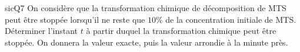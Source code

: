 \begin{questionmult}{sicQ7}
    On considère que la transformation chimique de décomposition de MTS peut être stoppée lorsqu'il ne reste que $10\%$ de la concentration initiale de MTS. Déterminer l'instant $t$ à partir duquel la transformation chimique peut être stoppée. On donnera la valeur exacte, puis la valeur arrondie à la minute près.\\
    \begin{EnvQuadrillage}[NbCarreaux=19x6,Grille=Seyes,Marge=1]
    \end{EnvQuadrillage}
\end{questionmult}
